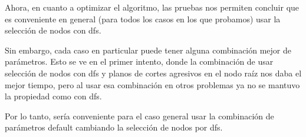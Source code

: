 \documentclass{article}
\begin{document}
    Ahora, en cuanto a optimizar el algoritmo, las pruebas nos permiten concluir que es conveniente en general (para todos los casos en los que probamos) usar la selección de nodos con dfs. 
    
    Sin embargo, cada caso en particular puede tener alguna combinación mejor de parámetros. Esto se ve en el primer intento, donde la combinación de usar selección de nodos con dfs y planos de cortes agresivos en el nodo raíz nos daba el mejor tiempo, pero al usar esa combinación en otros problemas ya no se mantuvo la propiedad como con dfs. 
    
    Por lo tanto, sería conveniente para el caso general usar la combinación de parámetros default cambiando la selección de nodos por dfs.
    
    
\end{document}
